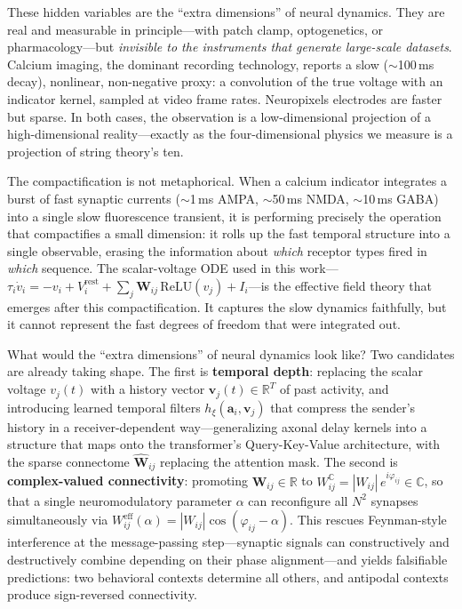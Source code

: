 \documentclass[11pt,twocolumn]{article}
\begin{document}
These hidden variables are the ``extra dimensions'' of neural dynamics. They are real and measurable in principle---with patch clamp, optogenetics, or pharmacology---but \emph{invisible to the instruments that generate large-scale datasets}. Calcium imaging, the dominant recording technology, reports a slow ($\sim$100\,ms decay), nonlinear, non-negative proxy: a convolution of the true voltage with an indicator kernel, sampled at video frame rates. Neuropixels electrodes are faster but sparse. In both cases, the observation is a low-dimensional projection of a high-dimensional reality---exactly as the four-dimensional physics we measure is a projection of string theory's ten.

The compactification is not metaphorical. When a calcium indicator integrates a burst of fast synaptic currents ($\sim$1\,ms AMPA, $\sim$50\,ms NMDA, $\sim$10\,ms GABA) into a single slow fluorescence transient, it is performing precisely the operation that compactifies a small dimension: it rolls up the fast temporal structure into a single observable, erasing the information about \emph{which} receptor types fired in \emph{which} sequence. The scalar-voltage ODE used in this work---$\tau_i \dot{v}_i = -v_i + V_i^{\text{rest}} + \sum_j \mathbf{W}_{ij}\,\text{ReLU}(v_j) + I_i$---is the effective field theory that emerges after this compactification. It captures the slow dynamics faithfully, but it cannot represent the fast degrees of freedom that were integrated out.

What would the ``extra dimensions'' of neural dynamics look like? Two candidates are already taking shape. The first is \textbf{temporal depth}: replacing the scalar voltage $v_j(t)$ with a history vector $\mathbf{v}_j(t) \in \mathbb{R}^T$ of past activity, and introducing learned temporal filters $h_\xi(\mathbf{a}_i, \mathbf{v}_j)$ that compress the sender's history in a receiver-dependent way---generalizing axonal delay kernels into a structure that maps onto the transformer's Query-Key-Value architecture, with the sparse connectome $\widehat{\mathbf{W}}_{ij}$ replacing the attention mask. The second is \textbf{complex-valued connectivity}: promoting $\mathbf{W}_{ij} \in \mathbb{R}$ to $W_{ij}^{\mathbb{C}} = |W_{ij}|\,e^{i\varphi_{ij}} \in \mathbb{C}$, so that a single neuromodulatory parameter $\alpha$ can reconfigure all $N^2$ synapses simultaneously via $W_{ij}^{\text{eff}}(\alpha) = |W_{ij}|\cos(\varphi_{ij} - \alpha)$. This rescues Feynman-style interference at the message-passing step---synaptic signals can constructively and destructively combine depending on their phase alignment---and yields falsifiable predictions: two behavioral contexts determine all others, and antipodal contexts produce sign-reversed connectivity.
\end{document}
